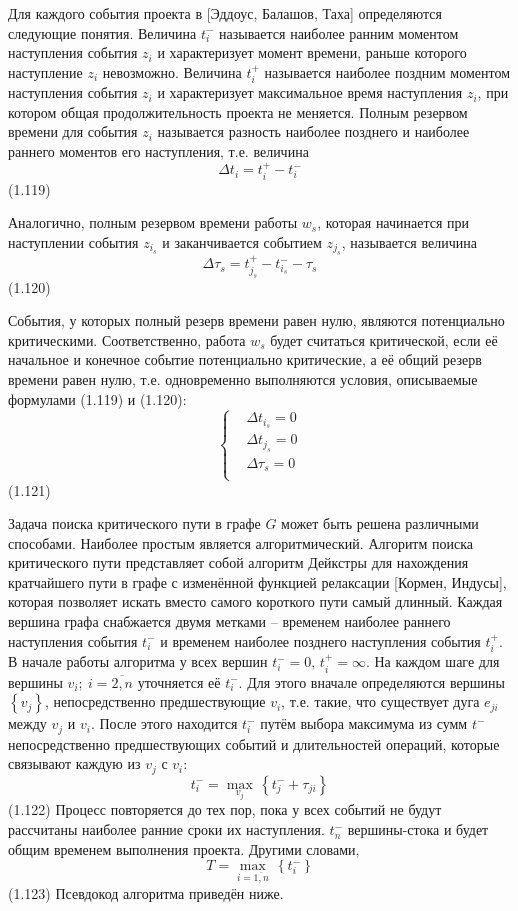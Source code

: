 Для каждого события проекта в [Эддоус, Балашов, Таха] определяются следующие понятия. Величина $t_{i}^{-}$ называется наиболее ранним моментом наступления события ${{z}_{i}}$ и характеризует момент времени, раньше которого наступление ${{z}_{i}}$ невозможно. Величина $t_{i}^{+}$ называется наиболее поздним моментом наступления события ${{z}_{i}}$ и характеризует максимальное время наступления ${{z}_{i}}$, при котором общая продолжительность проекта не меняется. Полным резервом времени для события ${{z}_{i}}$ называется разность наиболее позднего и наиболее раннего моментов его наступления, т.е. величина
	\[\Delta t_i=t^+_i-t^-_i\] 	(1.119)
	
Аналогично, полным резервом времени работы ${{w}_{s}}$, которая начинается при наступлении события ${{z}_{{{i}_{s}}}}$ и заканчивается событием ${{z}_{{{j}_{s}}}}$, называется величина
	\[\Delta {{\tau }_{s}}=t_{{{j}_{s}}}^{+}-t_{{{i}_{s}}}^{-}-{{\tau }_{s}}\] 	(1.120)
	
События, у которых полный резерв времени равен нулю, являются потенциально критическими. Соответственно, работа ${{w}_{s}}$ будет считаться критической, если её начальное и конечное событие потенциально критические, а её общий резерв времени равен нулю, т.е. одновременно выполняются условия, описываемые формулами (1.119) и (1.120):
	\[\left\{ \begin{aligned}
  & \Delta {{t}_{{{i}_{s}}}}=0 \\ 
 & \Delta {{t}_{{{j}_{s}}}}=0 \\ 
 & \Delta {{\tau }_{s}}=0 \\ 
\end{aligned} \right.\] 	(1.121)

Задача поиска критического пути в графе $G$ может быть решена различными способами. Наиболее простым является алгоритмический. Алгоритм поиска критического пути представляет собой алгоритм Дейкстры для нахождения кратчайшего пути в графе с изменённой функцией релаксации [Кормен, Индусы], которая позволяет искать вместо самого короткого пути самый длинный. Каждая вершина графа снабжается двумя метками – временем наиболее раннего наступления события $t_{i}^{-}$ и временем наиболее позднего наступления события $t_{i}^{+}$. В начале работы алгоритма у всех вершин $t_{i}^{-}=0$, $t_{i}^{+}=\infty $. На каждом шаге для вершины ${{v}_{i}};\ i=\overline{2,n}$ уточняется её $t_{i}^{-}$. Для этого вначале определяются вершины $\left\{ {{v}_{j}} \right\}$, непосредственно предшествующие ${{v}_{i}}$, т.е. такие, что существует дуга ${{e}_{ji}}$ между ${{v}_{j}}$ и ${{v}_{i}}$. После этого находится $t_{i}^{-}$ путём выбора максимума из сумм ${{t}^{-}}$ непосредственно предшествующих событий и длительностей операций, которые связывают каждую из ${{v}_{j}}$ с ${{v}_{i}}$:
	\[t_{i}^{-}=\underset{{{v}_{j}}}{\mathop{\max }}\,\left\{ t_{j}^{-}+{{\tau }_{ji}} \right\}\] 	(1.122)
Процесс повторяется до тех пор, пока у всех событий не будут рассчитаны наиболее ранние сроки их наступления. $t_{n}^{-}$ вершины-стока и будет общим временем выполнения проекта. Другими словами,
	\[T=\underset{i=\overline{1,n}}{\mathop{\max }}\,\left\{ t_{i}^{-} \right\}\] 	(1.123)
Псевдокод алгоритма приведён ниже.

